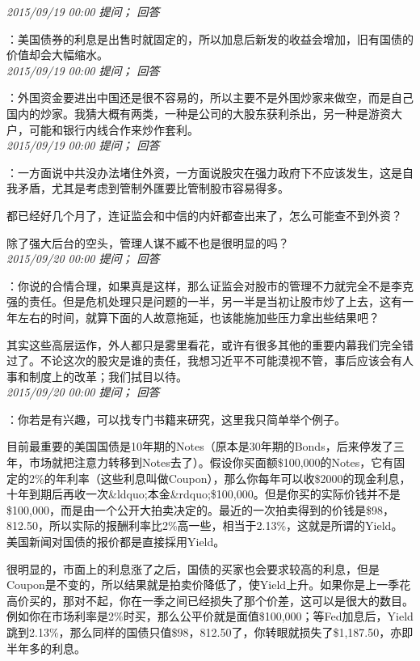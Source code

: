 \documentclass[twocolumn]{ctexart}
\begin{document}
\textit{\hfill\noindent\small 2015/09/19 00:00 提问； 回答}

：美国债券的利息是出售时就固定的，所以加息后新发的收益会增加，旧有国债的价值却会大幅缩水。\\

\textit{\hfill\noindent\small 2015/09/19 00:00 提问； 回答}

：外国资金要进出中国还是很不容易的，所以主要不是外国炒家来做空，而是自己国内的炒家。我猜大概有两类，一种是公司的大股东获利杀出，另一种是游资大户，可能和银行内线合作来炒作套利。\\

\textit{\hfill\noindent\small 2015/09/19 00:00 提问； 回答}

：一方面说中共没办法堵住外资，一方面说股灾在强力政府下不应该发生，这是自我矛盾，尤其是考虑到管制外匯要比管制股市容易得多。

都已经好几个月了，连证监会和中信的内奸都查出来了，怎么可能查不到外资？

除了强大后台的空头，管理人谋不臧不也是很明显的吗？\\

\textit{\hfill\noindent\small 2015/09/20 00:00 提问； 回答}

：你说的合情合理，如果真是这样，那么证监会对股市的管理不力就完全不是李克强的责任。但是危机处理只是问题的一半，另一半是当初让股市炒了上去，这有一年左右的时间，就算下面的人故意拖延，也该能施加些压力拿出些结果吧？

其实这些高层运作，外人都只是雾里看花，或许有很多其他的重要内幕我们完全错过了。不论这次的股灾是谁的责任，我想习近平不可能漠视不管，事后应该会有人事和制度上的改革；我们拭目以待。\\

\textit{\hfill\noindent\small 2015/09/20 00:00 提问； 回答}

：你若是有兴趣，可以找专门书籍来研究，这里我只简单举个例子。

目前最重要的美国国债是10年期的Notes（原本是30年期的Bonds，后来停发了三年，市场就把注意力转移到Notes去了）。假设你买面额\$100,000的Notes，它有固定的2\%的年利率（这些利息叫做Coupon），那么你每年可以收\$2000的现金利息，十年到期后再收一次\&ldquo;本金\&rdquo;\$100,000。但是你买的实际价钱并不是\$100,000，而是由一个公开大拍卖决定的。最近的一次拍卖得到的价钱是\$98，812.50，所以实际的报酬利率比2\%高一些，相当于2.13\%，这就是所谓的Yield。美国新闻对国债的报价都是直接採用Yield。

很明显的，市面上的利息涨了之后，国债的买家也会要求较高的利息，但是Coupon是不变的，所以结果就是拍卖价降低了，使Yield上升。如果你是上一季花高价买的，那对不起，你在一季之间已经损失了那个价差，这可以是很大的数目。例如你在市场利率是2\%时买，那么公平价就是面值\$100,000；等Fed加息后，Yield跳到2.13\%，那么同样的国债只值\$98，812.50了，你转眼就损失了\$1,187.50，亦即半年多的利息。\\
\end{document}
